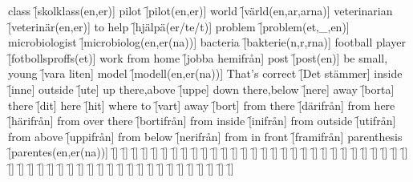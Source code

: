 \begin{questions}
    \begin{multicols}{2}
        \raggedcolumns
        \question class \f[skolklass(en,er)]
        \question pilot \f[pilot(en,er)]
        \question world \f[värld(en,ar,arna)]
        \question veterinarian \f[veterinär(en,er)]
        \question to help \f[hjälpä(er/te/t)]
        \question problem \f[problem(et,\_,en)]
        \question microbiologist \f[microbiolog(en,er(na))]
        \question bacteria \f[bakterie(n,r,rna)]
        \question football player \f[fotbollsproffs(et)]
        \question work from home \f[jobba hemifrån]
        \question post \f[post(en)]
        \question be small, young \f[vara liten]
        \question model \f[modell(en,er(na))]
        \question That's correct \f[Det stämmer]
        \question inside \f[inne]
        \question outside \f[ute]
        \question up there,above \f[uppe]
        \question down there,below \f[nere]
        \question away \f[borta]
        \question there \f[dit]
        \question here \f[hit]
        \question where to \f[vart]
        \question away \f[bort]
        \question from there \f[därifrån]
        \question from here \f[härifrån]
        \question from over there \f[bortifrån]
        \question from inside \f[inifrån]
        \question from outside \f[utifrån]
        \question from above \f[uppifrån]
        \question from below \f[nerifrån]
        \question from in front \f[framifrån]
        \question parenthesis \f[parentes(en,er(na))]
        \question  \f[]
        \question  \f[]
        \question  \f[]
        \question  \f[]
        \question  \f[]
        \question  \f[]
        \question  \f[]
        \question  \f[]
        \question  \f[]
        \question  \f[]
        \question  \f[]
        \question  \f[]
        \question  \f[]
        \question  \f[]
        \question  \f[]
        \question  \f[]
        \question  \f[]
        \question  \f[]
        \question  \f[]
        \question  \f[]
        \question  \f[]
        \question  \f[]
        \question  \f[]
        \question  \f[]
        \question  \f[]
        \question  \f[]
        \question  \f[]
        \question  \f[]
        \question  \f[]
        \question  \f[]
        \question  \f[]
        \question  \f[]
        \question  \f[]
        \question  \f[]
        \question  \f[]
        \question  \f[]
        \question  \f[]
        \question  \f[]
        \question  \f[]
        \question  \f[]
        \question  \f[]
        \question  \f[]
        \question  \f[]
        \question  \f[]
        \question  \f[]
        \question  \f[]
        \question  \f[]
        \question  \f[]
        \question  \f[]
        \question  \f[]
        \question  \f[]
        \question  \f[]
        \question  \f[]
    \end{multicols}
\end{questions}
